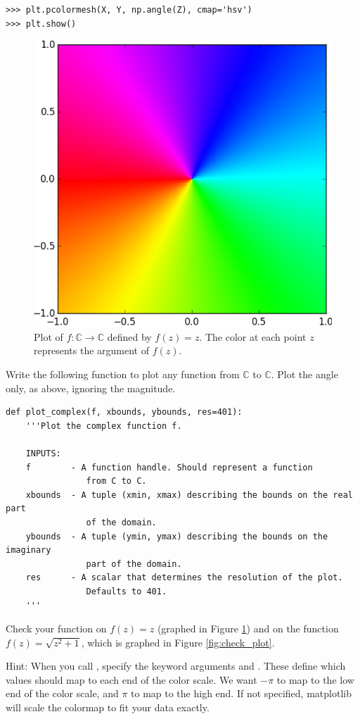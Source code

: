 \begin{lstlisting}
>>> plt.pcolormesh(X, Y, np.angle(Z), cmap='hsv')
>>> plt.show()
\end{lstlisting}


\begin{figure}
\includegraphics[width=.7\textwidth]{figures/Identity.pdf}
\caption{Plot of $f: \mathbb{C} \rightarrow \mathbb{C}$ defined by $f(z)=z$.
The color at each point $z$ represents the argument of $f(z)$.}
\label{fig:identity}
\end{figure}





\begin{problem}
Write the following function to plot any function from $\mathbb{C}$ to $\mathbb{C}$.
Plot the angle only, as above, ignoring the magnitude.
\begin{lstlisting}
def plot_complex(f, xbounds, ybounds, res=401):
    '''Plot the complex function f.

    INPUTS:
    f        - A function handle. Should represent a function
    			from C to C.
    xbounds  - A tuple (xmin, xmax) describing the bounds on the real part
    			of the domain.
    ybounds  - A tuple (ymin, ymax) describing the bounds on the imaginary
    			part of the domain.
    res      - A scalar that determines the resolution of the plot.
    			Defaults to 401.
    '''
\end{lstlisting}
Check your function on $f(z) = z$ (graphed in Figure \ref{fig:identity}) and on the function $f(z) = \sqrt{z^2+1}$, which is graphed in Figure \ref{fig:check_plot}.

Hint: When you call , specify the keyword arguments  and .
These define which values should map to each end of the color scale.
We want $-\pi$ to map to the low end of the color scale, and $\pi$ to map to the high end.
If not specified, matplotlib will scale the colormap to fit your data exactly.

\label{prob:plot_complex}
\end{problem}

